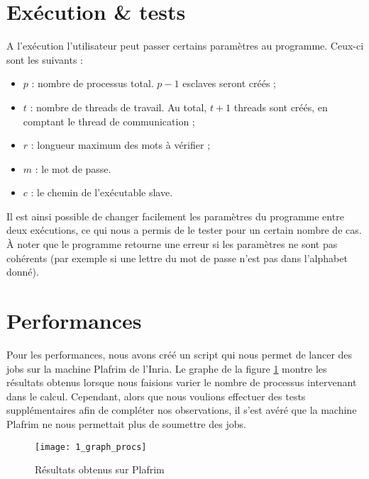 \section{Exécution \& tests} %
\label{sec:execution}

A l'exécution l'utilisateur peut passer certains paramètres au programme. Ceux-ci sont les suivants :
\begin{itemize}
	\item $p$ : nombre de processus total. $p-1$ esclaves seront créés ;
	\item $t$ : nombre de threads de travail. Au total, $t+1$ threads sont créés, en comptant le thread de communication ;
	\item $r$ : longueur maximum des mots à vérifier ;
	\item $m$ : le mot de passe.
	\item $c$ : le chemin de l'exécutable \og slave\fg .
\end{itemize}

Il est ainsi possible de changer facilement les paramètres du programme entre deux exécutions, ce qui nous a permis de le tester pour un certain nombre de cas. \`A noter que le programme retourne une erreur si les paramètres ne sont pas cohérents (par exemple si une lettre du mot de passe n'est pas dans l'alphabet donné).


\section{Performances} %
\label{sec:perf}

Pour les performances, nous avons créé un script qui nous permet de lancer des jobs sur la machine Plafrim de l'Inria. Le graphe de la figure \ref{fig:graph_procs} montre les résultats obtenus lorsque nous faisions varier le nombre de processus intervenant dans le calcul. Cependant, alors que nous voulions effectuer des tests supplémentaires afin de compléter nos observations, il s'est avéré que la machine Plafrim ne nous permettait plus de soumettre des jobs. 

\begin{figure}[h!]
\centering
\texttt{[image: 1\_graph\_procs]}
\caption{Résultats obtenus sur Plafrim}
\label{fig:graph_procs}
\end{figure}

